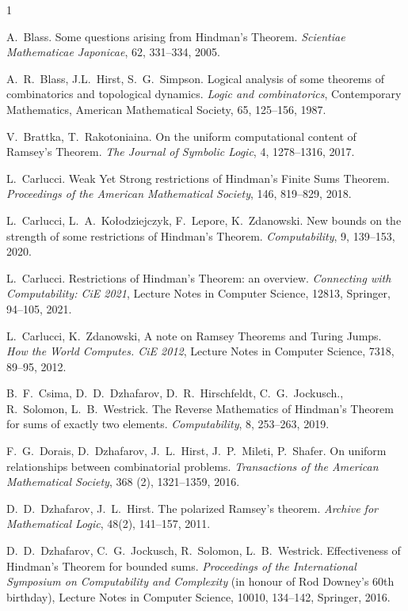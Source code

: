 \documentclass[a4paper,11pt]{article}
\begin{document}
\begin{thebibliography}{1}

A.~Blass.
Some questions arising from Hindman's Theorem.
{\em Scientiae Mathematicae Japonicae}, 62, 331--334, 2005.

A.~R.~Blass, J.L.~Hirst, S.~G.~Simpson. 
Logical analysis of some theorems of combinatorics and topological dynamics. 
{\em Logic and combinatorics}, Contemporary Mathematics, American Mathematical Society, 65, 125--156, 1987.

V.~Brattka, T.~Rakotoniaina.
On the uniform computational content of Ramsey’s Theorem. 
{\em The Journal of Symbolic Logic}, 4, 1278--1316, 2017.


L.~Carlucci. 
Weak Yet Strong restrictions of Hindman's Finite Sums Theorem. 
{\em Proceedings of the American Mathematical Society}, 146, 819--829, 2018.

L.~Carlucci, L.~A.~Ko{\l}odziejczyk, F.~Lepore, K.~Zdanowski.
New bounds on the strength of some restrictions of Hindman's Theorem.
{\em Computability}, 9, 139--153, 2020.

L.~Carlucci. 
Restrictions of Hindman’s Theorem: an overview.
{\em Connecting with Computability: CiE 2021}, Lecture
Notes in Computer Science, 12813, Springer, 94--105, 2021.

L.~Carlucci, K.~Zdanowski, 
A note on Ramsey Theorems and Turing Jumps. {\em How the World Computes. CiE 2012}, 
Lecture Notes in Computer Science, 7318, 89--95, 2012.

B.~F.~Csima, D.~D.~Dzhafarov, D.~R.~Hirschfeldt, 
C.~G.~Jockusch., R.~Solomon, L.~B.~Westrick. 
The Reverse Mathematics of Hindman's Theorem for sums of exactly two elements. 
{\em Computability}, 8, 253--263, 2019.

F.~G.~Dorais, D.~Dzhafarov, J.~L.~Hirst, J.~P.~Mileti, P.~Shafer. 
On uniform relationships between combinatorial problems. 
{\em Transactions of the American Mathematical Society}, 368 (2), 1321--1359, 2016.

D.~D.~Dzhafarov, J.~L.~Hirst.
The polarized Ramsey's theorem.
{\em Archive for Mathematical Logic}, 48(2), 141--157, 2011.

D.~D.~Dzhafarov, C.~G.~Jockusch, R.~Solomon, L.~B.~Westrick. 
Effectiveness of Hindman's Theorem for bounded sums. 
{\em Proceedings of the International Symposium on Computability and Complexity} 
(in honour of Rod Downey's 60th birthday), Lecture Notes in Computer Science, 10010, 
134--142, Springer, 2016.


\end{thebibliography}
\end{document}
